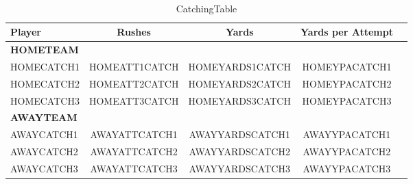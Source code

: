 \begin{table}[htbp]\
\def\sym#1{\ifmmode^{#1}\else\(^{#1}\)\fi}
\caption{CatchingTable\label{tab1}}
{
\centering
\begin{tabular}{l*{4}{c}}
\hline\hline
            Player&\multicolumn{1}{c}{Rushes}&\multicolumn{1}{c}{Yards}&\multicolumn{1}{c}{Yards per Attempt}\\
\hline
\textbf{HOMETEAM}\\
HOMECATCH1 &     HOMEATT1CATCH&    HOMEYARDS1CATCH&  HOMEYPACATCH1\\
HOMECATCH2 &     HOMEATT2CATCH&    HOMEYARDS2CATCH&  HOMEYPACATCH2\\
HOMECATCH3 &     HOMEATT3CATCH&    HOMEYARDS3CATCH&  HOMEYPACATCH3\\
[1em]
\textbf{AWAYTEAM}\\
AWAYCATCH1 &     AWAYATTCATCH1&    AWAYYARDSCATCH1&  AWAYYPACATCH1\\
AWAYCATCH2 &     AWAYATTCATCH2&    AWAYYARDSCATCH2&  AWAYYPACATCH2\\
AWAYCATCH3 &     AWAYATTCATCH3&    AWAYYARDSCATCH3&  AWAYYPACATCH3\\
\hline\hline
\end{tabular}
}
\label{tab:catch}
\end{table}
